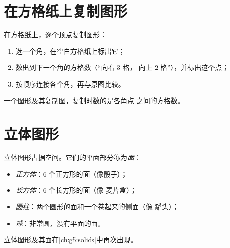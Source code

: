 \section{在方格纸上复制图形}

\begin{method}[复制图形]\label{met:g2:shapes:copy}
在方格纸上，逐个顶点复制图形：
\begin{enumerate}
  \item 选一个角，在空白方格纸上标出它；
  \item 数出到下一个角的方格数（“向右 $3$ 格，
        向上 $2$ 格”），并标出这个点；
  \item 按顺序连接各个角，再与原图比较。
\end{enumerate}
\end{method}

\begin{omfigure}

{\small 一个图形及其复制图，复制时数的是各角点
之间的方格数。}
\end{omfigure}

\section{立体图形}

\begin{definition}[最初的立体图形]\label{def:g2:shapes:solids}
立体图形占据空间。它们的平面部分称为\emph{面}：
\begin{itemize}
  \item \emph{正方体}：$6$ 个正方形的面（像骰子）；
  \item \emph{长方体}：$6$ 个长方形的面（像
        麦片盒）；
  \item \emph{圆柱}：两个圆形的面和一个卷起来的侧面（像
        罐头）；
  \item \emph{球}：非常圆，没有平面的面。
\end{itemize}
立体图形及其面在\cref{ch:g5:solids}中再次出现。
\end{definition}

